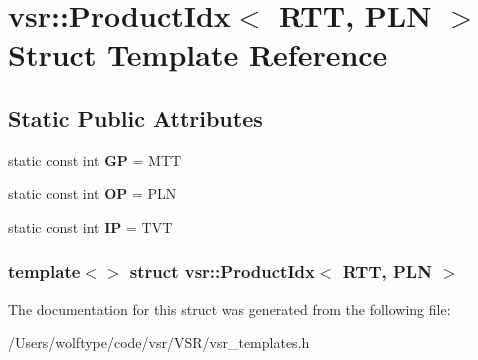 \hypertarget{structvsr_1_1_product_idx_3_01_r_t_t_00_01_p_l_n_01_4}{\section{vsr\-:\-:Product\-Idx$<$ R\-T\-T, P\-L\-N $>$ Struct Template Reference}
\label{structvsr_1_1_product_idx_3_01_r_t_t_00_01_p_l_n_01_4}
}
\subsection*{Static Public Attributes}
\begin{DoxyCompactItemize}
\item 
\hypertarget{structvsr_1_1_product_idx_3_01_r_t_t_00_01_p_l_n_01_4_a1cbcb277ecd4f674908fa848a4357451}{static const int {\bfseries G\-P} = M\-T\-T}\label{structvsr_1_1_product_idx_3_01_r_t_t_00_01_p_l_n_01_4_a1cbcb277ecd4f674908fa848a4357451}

\item 
\hypertarget{structvsr_1_1_product_idx_3_01_r_t_t_00_01_p_l_n_01_4_a949868b0c2ac3f8c1ca0773f375ede14}{static const int {\bfseries O\-P} = P\-L\-N}\label{structvsr_1_1_product_idx_3_01_r_t_t_00_01_p_l_n_01_4_a949868b0c2ac3f8c1ca0773f375ede14}

\item 
\hypertarget{structvsr_1_1_product_idx_3_01_r_t_t_00_01_p_l_n_01_4_a97845eabc412d9f7dce337fa699da844}{static const int {\bfseries I\-P} = T\-V\-T}\label{structvsr_1_1_product_idx_3_01_r_t_t_00_01_p_l_n_01_4_a97845eabc412d9f7dce337fa699da844}

\end{DoxyCompactItemize}
\subsubsection*{template$<$$>$ struct vsr\-::\-Product\-Idx$<$ R\-T\-T, P\-L\-N $>$}



The documentation for this struct was generated from the following file\-:\begin{DoxyCompactItemize}
\item 
/\-Users/wolftype/code/vsr/\-V\-S\-R/vsr\-\_\-templates.\-h\end{DoxyCompactItemize}
